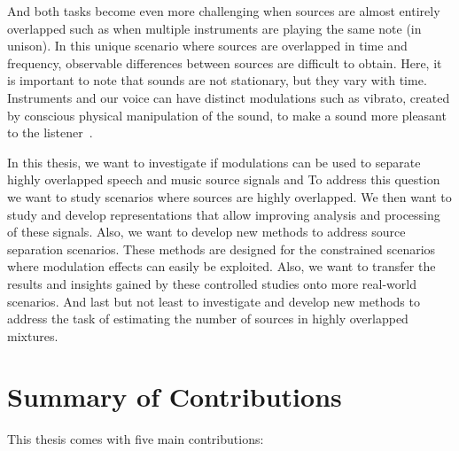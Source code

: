 And both tasks become even more challenging when sources are almost entirely overlapped such as when multiple instruments are playing the same note (in unison).
In this unique scenario where sources are overlapped in time and frequency, observable differences between sources are difficult to obtain.
Here, it is important to note that sounds are not stationary, but they vary with time.
Instruments and our voice can have distinct modulations such as vibrato, created by conscious physical manipulation of the sound, to make a sound more pleasant to the listener~\cite{fletcher01}.
\par
In this thesis, we want to investigate if modulations can be used to separate highly overlapped speech and music source signals and 
To address this question we want to study scenarios where sources are highly overlapped.
We then want to study and develop representations that allow improving analysis and processing of these signals.
Also, we want to develop new methods to address source separation scenarios. 
These methods are designed for the constrained scenarios where modulation effects can easily be exploited.
Also, we want to transfer the results and insights gained by these controlled studies onto more real-world scenarios.
And last but not least to investigate and develop new methods to address the task of estimating the number of sources in highly overlapped mixtures.



\clearpage
\section{Summary of Contributions}

This thesis comes with five main contributions:

